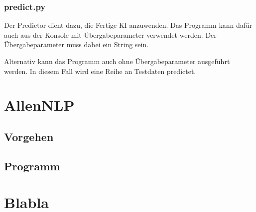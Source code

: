 \documentclass[10pt,a4paper]{article}
\begin{document}
\subsubsection{predict.py}
\begin{flushleft}
Der Predictor dient dazu, die Fertige KI anzuwenden. Das Programm kann dafür auch aus der Konsole mit Übergabeparameter verwendet werden. Der Übergabeparameter muss dabei ein String sein.

Alternativ kann das Programm auch ohne Übergabeparameter ausgeführt werden. In diesem Fall wird eine Reihe an Testdaten predictet.
\end{flushleft}

\section{AllenNLP}

\subsection{Vorgehen}

\subsection{Programm}

\section{Blabla}
\end{document}
